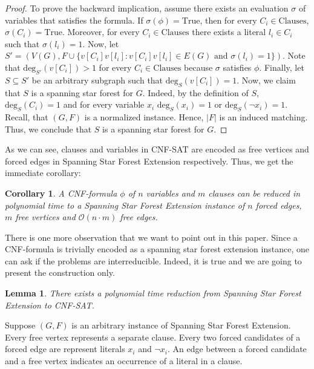\documentclass[en]{pracamgr}
\newtheorem{lemma}{Lemma}
\newtheorem{corollary}{Corollary}
\newenvironment{sproof}{%
	\renewcommand{\proofname}{Proof (sketch).}\proof}{\endproof}
\newcommand{\ssfep}{{\sc Spanning Star Forest Extension}}
\newcommand{\cnfsat}{{\sc CNF-SAT}}
\newcommand{\degree}[2]{\textrm{deg}_{#1}(#2)}
\begin{document}
\begin{proof}
	To prove the backward implication, assume there exists an evaluation $\sigma$ of variables that satisfies the formula. If $\sigma(\phi)=\textrm{True}$, then for every $C_i \in \textrm{Clauses}$, $\sigma(C_i)=\textrm{True}$. Moreover, for every $C_i \in \textrm{Clauses}$ there exists a literal $l_i \in C_i$ such that $\sigma(l_i)=1$. Now, let $S' = (V(G), F \cup \{v[C_i]v[l_i]: v[C_i]v[l_i] \in E(G) \text{ and } \sigma(l_i)=1\})$. Note that $\degree{S'}{v[C_i]}>1$ for every $C_i \in \textrm{Clauses}$ because $\sigma$ satisfies $\phi$. Finally, let $S \subseteq S'$ be an arbitrary subgraph such that $\degree{S}{v[C_i]}=1$. Now, we claim that $S$ is a spanning star forest for $G$. Indeed, by the definition of $S$, $\degree{S}{C_i}=1$ and for every variable $x_i$ $\degree{S}{x_i}=1$ or $\degree{S}{\neg x_i}=1$. Recall, that $(G,F)$ is a normalized instance. Hence, $|F|$ is an induced matching. Thus, we conclude that $S$ is a spanning star forest for $G$.
\end{proof}

As we can see, clauses and variables in \cnfsat{} are encoded as free vertices and forced edges in \ssfep{} respectively. Thus, we get the immediate corollary:

\begin{corollary}\label{ssfep size}
	A CNF-formula $\phi$ of $n$ variables and $m$ clauses can be reduced in polynomial time to a \ssfep{} instance of $n$ forced edges, $m$ free vertices and $\mathcal{O}(n\cdot m)$ free edges.
\end{corollary}

There is one more observation that we want to point out in this paper. Since a CNF-formula is trivially encoded as a spanning star forest extension instance, one can ask if the problems are interreducible. Indeed, it is true and we are going to present the construction only.

\begin{lemma}\label{cnfsat reduction}
	There exists a polynomial time reduction from \ssfep{} to \cnfsat{}.
\end{lemma}

\begin{sproof}
	Suppose $(G,F)$ is an arbitrary instance of \ssfep{}. Every free vertex represents a separate clause. Every two forced candidates of a forced edge are represent literals $x_i$ and $\neg x_i$. An edge between a forced candidate and a free vertex indicates an occurrence of a literal in a clause.
\end{sproof}
\end{document}
